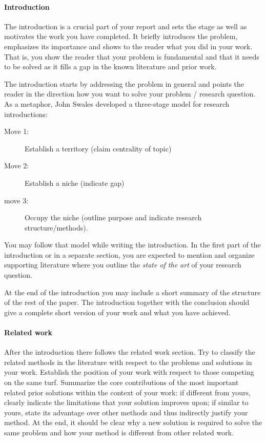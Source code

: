 \documentclass[11pt, a4paper,oneside,chapterprefix=false]{scrbook}
\begin{document}
\paragraph{Introduction}
The introduction is a crucial part of your report and sets the stage as well as motivates the work you have completed. It briefly introduces the problem, emphasizes its importance and shows to the reader what you did in your work. That is, you show the reader that your problem is fundamental and that it needs to be solved as it fills a gap in the known literature and prior work.

The introduction starts by addressing the problem in general and points the reader in the direction how you want to solve your problem / research question. As a metaphor, John Swales developed a three-stage model for research introductions: 

\begin{description}
\item[Move 1:] Establish a territory (claim centrality of topic)
\item[Move 2:] Establish a niche (indicate gap)
\item[move 3:] Occupy the niche (outline purpose and indicate research structure/methods).
\end{description}

You may follow that model while writing the introduction. In the first part of the introduction or in a separate section, you are expected to mention and organize supporting literature where you outline the {\em state of the art} of your research question.

At the end of the introduction you may include a short summary of the structure of the rest of the paper. The introduction together with the conclusion should give a complete short version of your work and what you have achieved.

\paragraph{Related work}
After the introduction there follows the related work section. Try to classify the related methods in the literature with respect to the problems and solutions in your work. Establish the position of your work with respect to those competing on the same turf. Summarize the core contributions of the most important related prior solutions within the context of your work: if different from yours, clearly indicate the limitations that your solution improves upon; if similar to yours, state its advantage over other methods and thus indirectly justify your method. At the end, it should be clear why a new solution is required to solve the same problem and how your method is different from other related work.
\end{document}
